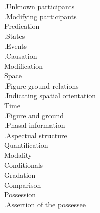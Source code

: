\begin{figure}
{.\hspace{.5cm}Unknown participants \\
.\hspace{.5cm}Modifying participants \\
Predication\\
.\hspace{.5cm}States \\
.\hspace{.5cm}Events \\
.\hspace{.5cm}Causation \\
Modification\\
Space\\
.\hspace{.5cm}Figure-ground relations \\
.\hspace{.5cm}Indicating   spatial orientation  \\
Time\\
.\hspace{.5cm}Figure and ground \\
.\hspace{.5cm}Phasal information \\
.\hspace{.5cm}Aspectual structure \\
Quantification\\
Modality\\
Conditionals\\
Gradation\\
Comparison\\
Possession\\
.\hspace{.5cm}Assertion of the possessee \\
}
\end{figure}
